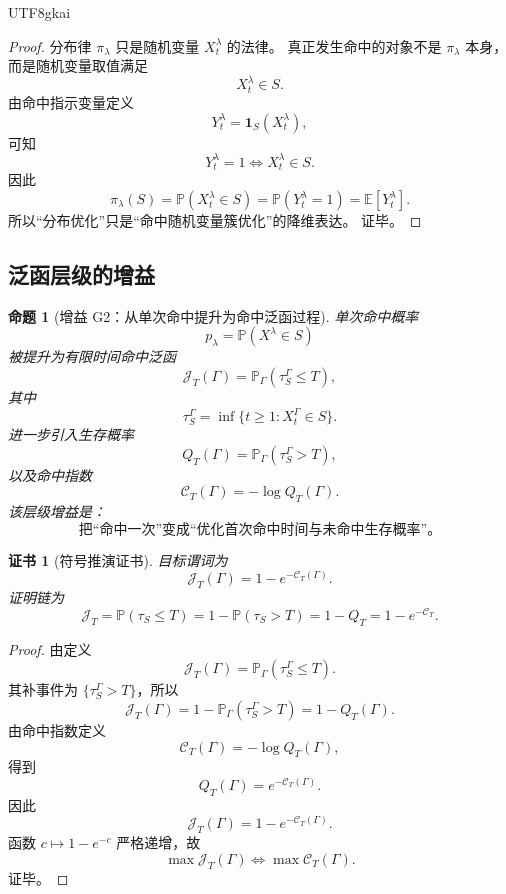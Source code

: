 \documentclass[12pt]{article}
\newtheorem{proposition}{命题}[section]
\newtheorem{Certificate}{证书}[section]
\begin{document}
\begin{CJK*}{UTF8}{gkai}
\begin{proof}
分布律 \(\pi_\lambda\) 只是随机变量 \(X_t^\lambda\) 的法律。
真正发生命中的对象不是 \(\pi_\lambda\) 本身，而是随机变量取值满足
\[
  X_t^\lambda\in S.
\]
由命中指示变量定义
\[
  Y_t^\lambda=\mathbf 1_S(X_t^\lambda),
\]
可知
\[
  Y_t^\lambda=1
  \Longleftrightarrow
  X_t^\lambda\in S.
\]
因此
\[
  \pi_\lambda(S)
  =
  \mathbb P(X_t^\lambda\in S)
  =
  \mathbb P(Y_t^\lambda=1)
  =
  \mathbb E[Y_t^\lambda].
\]
所以“分布优化”只是“命中随机变量簇优化”的降维表达。
证毕。
\end{proof}

\subsection{泛函层级的增益}
\label{subsec:tex55-gain-functional-level}

\begin{proposition}[增益 G2：从单次命中提升为命中泛函过程]
\label{prop:tex55-gain-functional-process}
单次命中概率
\[
  p_\lambda=\mathbb P(X^\lambda\in S)
\]
被提升为有限时间命中泛函
\[
  \mathcal J_T(\Gamma)
  =
  \mathbb P_\Gamma(\tau_S^\Gamma\le T),
\]
其中
\[
  \tau_S^\Gamma
  =
  \inf\{t\ge1:X_t^\Gamma\in S\}.
\]
进一步引入生存概率
\[
  Q_T(\Gamma)
  =
  \mathbb P_\Gamma(\tau_S^\Gamma>T),
\]
以及命中指数
\[
  \mathcal C_T(\Gamma)
  =
  -\log Q_T(\Gamma).
\]
该层级增益是：
\[
  \boxed{
  \text{把“命中一次”变成“优化首次命中时间与未命中生存概率”。}
  }
\]
\end{proposition}

\begin{Certificate}[符号推演证书]
\label{cert:tex55-gain-functional-process}
目标谓词为
\[
  \mathcal J_T(\Gamma)
  =
  1-e^{-\mathcal C_T(\Gamma)}.
\]
证明链为
\[
  \mathcal J_T
  =
  \mathbb P(\tau_S\le T)
  =
  1-\mathbb P(\tau_S>T)
  =
  1-Q_T
  =
  1-e^{-\mathcal C_T}.
\]
\end{Certificate}

\begin{proof}
由定义
\[
  \mathcal J_T(\Gamma)
  =
  \mathbb P_\Gamma(\tau_S^\Gamma\le T).
\]
其补事件为 \(\{\tau_S^\Gamma>T\}\)，所以
\[
  \mathcal J_T(\Gamma)
  =
  1-
  \mathbb P_\Gamma(\tau_S^\Gamma>T)
  =
  1-Q_T(\Gamma).
\]
由命中指数定义
\[
  \mathcal C_T(\Gamma)=-\log Q_T(\Gamma),
\]
得到
\[
  Q_T(\Gamma)=e^{-\mathcal C_T(\Gamma)}.
\]
因此
\[
  \mathcal J_T(\Gamma)
  =
  1-e^{-\mathcal C_T(\Gamma)}.
\]
函数 \(c\mapsto1-e^{-c}\) 严格递增，故
\[
  \max\mathcal J_T(\Gamma)
  \Longleftrightarrow
  \max\mathcal C_T(\Gamma).
\]
证毕。
\end{proof}


\end{CJK*}
\end{document}
